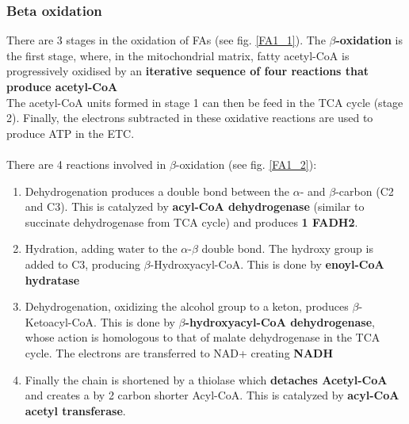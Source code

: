\documentclass[../main.tex]{subfiles}
\begin{document}
\subsubsection{Beta oxidation}
There are 3 stages in the oxidation of FAs (see fig. \ref{FA1_1}). The \textbf{$\beta$-oxidation} is the first stage, where, in the mitochondrial matrix, fatty acetyl-CoA is progressively oxidised by an \textbf{iterative sequence of four reactions that produce acetyl-CoA} \\
\indent The acetyl-CoA units formed in stage 1 can then be feed in the TCA cycle (stage 2). Finally, the electrons subtracted in these oxidative reactions are used to produce ATP in the ETC. \\
\\
There are 4 reactions involved in $\beta$-oxidation (see fig. \ref{FA1_2}): 
\begin{enumerate}
	\item Dehydrogenation produces a double bond between the $\alpha$- and $\beta$-carbon (C2 and C3). This is catalyzed by \textbf{acyl-CoA dehydrogenase} (similar to succinate dehydrogenase from TCA cycle) and produces \textbf{1 FADH2}.
	\item Hydration, adding water to the $\alpha$-$\beta$ double bond. The hydroxy group is added to C3, producing $\beta$-Hydroxyacyl-CoA. This is done by \textbf{enoyl-CoA hydratase}
	\item Dehydrogenation, oxidizing the alcohol group to a keton, produces $\beta$-Ketoacyl-CoA. This is done by \textbf{$\beta$-hydroxyacyl-CoA dehydrogenase}, whose action is homologous to that of malate dehydrogenase in the TCA cycle. The electrons are transferred to NAD+ creating \textbf{NADH}
	\item Finally the chain is shortened by a thiolase which \textbf{detaches Acetyl-CoA} and creates a by 2 carbon shorter Acyl-CoA. This is catalyzed by \textbf{acyl-CoA acetyl transferase}. 
\end{enumerate}
\end{document}
